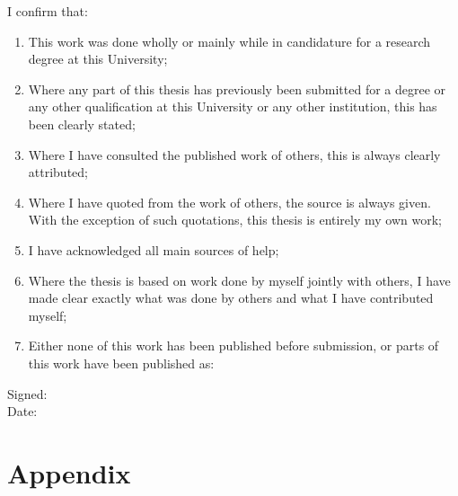 \documentclass[a4paper,12pt, openright, titlepage, twoside]{book}
\begin{document}
\noindent I confirm that:\\[-1.5cm]
\begin{enumerate}
\item This work was done wholly or mainly while in candidature for a research degree at this University;
\item Where any part of this thesis has previously been submitted for a degree or any other qualification at this University or any other institution, this has been clearly stated;
\item Where I have consulted the published work of others, this is always clearly attributed;
\item Where I have quoted from the work of others, the source is always given. With the exception of such quotations, this thesis is entirely my own work;
\item I have acknowledged all main sources of help;
\item Where the thesis is based on work done by myself jointly with others, I have made clear exactly what was done by others and what I have contributed myself;
\item Either none of this work has been published before submission, or parts of this work have been published as: \\

\end{enumerate}

Signed:\hrulefill\\%


Date:\hrulefill\\
\clearpage
{}
\setcounter{page}{1}
\mainmatter














\backmatter
\printglossaries

\singlespacing

\chapter{Appendix}\label{appendix}
\clearpage
\end{document}
